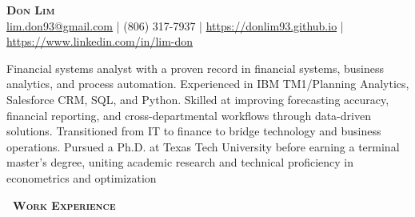 \documentclass[a4paper,11pt]{article}
\newcommand{\header} [1] {
    \vspace{1mm}
    {\textsc{\textbf{\Large{\xrfill[0.5ex]{0.5pt}~#1~\xrfill[0.5ex]{0.5pt}}}}} %
}
\begin{document}
\vspace*{-0.45in}
\fontsize{10.5}{11.5}\selectfont

\begin{raggedright}
    {\Huge\textbf\textsc{{{Don Lim}}}} \\
    \href{mailto:lim.don93@gmail.com}{lim.don93@gmail.com} | (806) 317-7937 | \href{https://donlim93.github.io/}{https://donlim93.github.io} | \href{https://www.linkedin.com/in/lim-don/}{https://www.linkedin.com/in/lim-don} \\ \vspace{2mm}
\end{raggedright}

Financial systems analyst with a proven record in financial systems, business analytics, and process automation. Experienced in IBM TM1/Planning Analytics, Salesforce CRM, SQL, and Python. Skilled at improving forecasting accuracy, financial reporting, and cross-departmental workflows through data-driven solutions. Transitioned from IT to finance to bridge technology and business operations. Pursued a Ph.D. at Texas Tech University before earning a terminal master’s degree, uniting academic research and technical proficiency in econometrics and optimization 

\vspace{1mm}
\header{Work Experience} 
\end{document}
